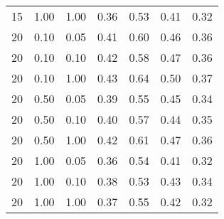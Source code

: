 \begin{tabular}{lllcccc}
15 & 1.00 & 1.00 & 0.36 & 0.53 & 0.41 & 0.32 \\ 
20 & 0.10 & 0.05 & 0.41 & 0.60 & 0.46 & 0.36 \\ 
20 & 0.10 & 0.10 & 0.42 & 0.58 & 0.47 & 0.36 \\ 
20 & 0.10 & 1.00 & 0.43 & 0.64 & 0.50 & 0.37 \\ 
20 & 0.50 & 0.05 & 0.39 & 0.55 & 0.45 & 0.34 \\ 
20 & 0.50 & 0.10 & 0.40 & 0.57 & 0.44 & 0.35 \\ 
20 & 0.50 & 1.00 & 0.42 & 0.61 & 0.47 & 0.36 \\ 
20 & 1.00 & 0.05 & 0.36 & 0.54 & 0.41 & 0.32 \\ 
20 & 1.00 & 0.10 & 0.38 & 0.53 & 0.43 & 0.34 \\ 
20 & 1.00 & 1.00 & 0.37 & 0.55 & 0.42 & 0.32 \\ 
\end{tabular} 
